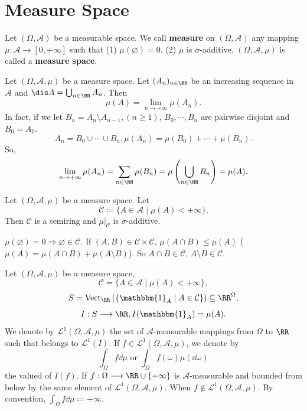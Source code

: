 \section{Measure Space}
\begin{definitionenv}
    Let $(\Omega,\mathcal{A})$ be a measurable space. We call \textbf{measure} on $(\Omega,\mathcal{A})$ any mapping $\mu:\mathcal{A}\longrightarrow [0,+\infty]$ such that
    \newline
    (1) $\mu(\varnothing)=0$.
    \newline
    (2) $\mu$ is $\sigma$-additive.
    \newline
    $(\Omega,\mathcal{A},\mu)$ is called a \textbf{measure space}.
\end{definitionenv}
\begin{remark}
    Let $(\Omega,\mathcal{A},\mu)$ be a measure space. Let $(A_n)_{n\in\NN}$ be an increasing sequence in $\mathcal{A}$ and $\dis A=\bigcup_{n\in \NN}A_n$.
    Then 
    $$ \mu(A)=\lim_{n\rightarrow +\infty} \mu(A_n).$$
    In fact, if we let $B_n=A_n\setminus A_{n-1}, (n\ge 1)$, $B_0,\cdots,B_n$ are pairwise disjoint and $B_0=A_0$.
    $$ A_n=B_0\cup \cdots \cup B_n, \mu(A_n)=\mu(B_0)+\cdots+ \mu(B_n).$$
    So,
    $$ \lim_{n\rightarrow +\infty} \mu(A_n)=\sum_{n\in \NN} \mu(B_n)=\mu\left(\bigcup_{n\in\NN}B_n\right)=\mu(A).$$
\end{remark}
\begin{propositionenv}
    Let $(\Omega,\mathcal{A},\mu)$ be a measure space. Let 
    $$\mathcal{C}\coloneq \{A\in \mathcal{A}\mid \mu(A)<+\infty\}.$$
    Then $\mathcal{C}$ is a semiring and $\mu|_\mathcal{C}$ is $\sigma$-additive.
\end{propositionenv}
\begin{proofenv}
    $\mu(\varnothing)=0\Rightarrow \varnothing\in \mathcal{C}$.
    If $(A,B)\in \mathcal{C}\times \mathcal{C}$, $\mu(A\cap B)\le \mu (A)$ ($\mu(A)=\mu(A\cap B)+\mu(A\setminus B)$).
    So $A\cap B\in \mathcal{C}$, $A\setminus B\in \mathcal{C}$.
\end{proofenv}
\begin{definitionenv}
    Let $(\Omega,\mathcal{A},\mu)$ be a measure space, 
    $$\mathcal{C}=\{A\in \mathcal{A}\mid \mu(A)<+\infty\},$$
    $$S=\mathrm{Vect}_{\RR}\left(\{\mathbbm{1}_{A}\mid A\in \mathcal{C}\}\right)\subseteq \RR^{\Omega},$$
    $$ I: S\longrightarrow \RR, I(\mathbbm{1}_{A})=\mu(A).$$
    We denote by $\mathcal{L}^1(\Omega,\mathcal{A},\mu)$ the set of $\mathcal{A}$-measurable mappings from $\Omega$ to $\RR$ such that belongs to $\mathcal{L}^1(I)$.
    If $f\in \mathcal{L}^1(\Omega, \mathcal{A},\mu)$, we denote by 
    $$ \int_{\Omega} f \dd\mu \text{ or } \int_{\Omega} f(\omega) \mu(\dd\omega)$$
    the valued of $I(f)$. If 
    $f:\Omega\longrightarrow \RR\cup\{+\infty\}$
    is $\mathcal{A}$-measurable and bounded from below by the same element of $\mathcal{L}^1(\Omega,\mathcal{A},\mu)$.
    When $f\notin \mathcal{L}^1(\Omega,\mathcal{A},\mu)$. By convention, $\displaystyle \int_{\Omega} f \dd\mu\coloneq +\infty$.
\end{definitionenv}
